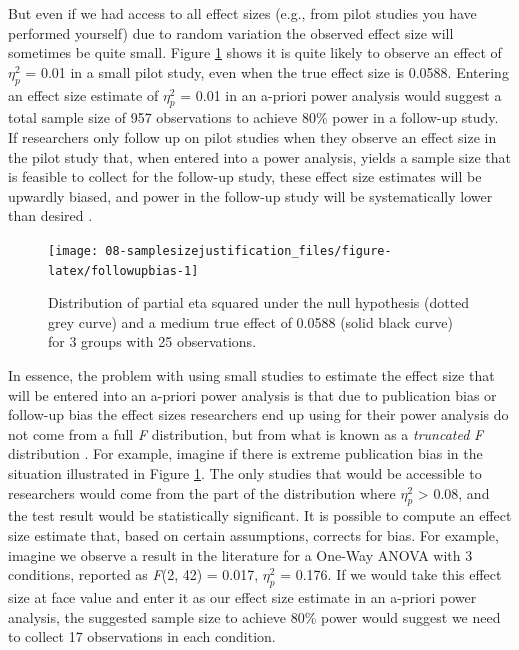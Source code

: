 \documentclass[
  oneside]{krantz}
\begin{document}
But even if we had access to all effect sizes (e.g., from pilot studies you have performed yourself) due to random variation the observed effect size will sometimes be quite small. Figure \ref{fig:followupbias} shows it is quite likely to observe an effect of \(\eta_p^2\) = 0.01 in a small pilot study, even when the true effect size is 0.0588. Entering an effect size estimate of \(\eta_p^2\) = 0.01 in an a-priori power analysis would suggest a total sample size of 957 observations to achieve 80\% power in a follow-up study. If researchers only follow up on pilot studies when they observe an effect size in the pilot study that, when entered into a power analysis, yields a sample size that is feasible to collect for the follow-up study, these effect size estimates will be upwardly biased, and power in the follow-up study will be systematically lower than desired \citep{albers_when_2018}.



\begin{figure}

{\centering \texttt{[image: 08-samplesizejustification\_files/figure-latex/followupbias-1]} 

}

\caption{Distribution of partial eta squared under the null hypothesis (dotted grey curve) and a medium true effect of 0.0588 (solid black curve) for 3 groups with 25 observations.}\label{fig:followupbias}
\end{figure}

In essence, the problem with using small studies to estimate the effect size that will be entered into an a-priori power analysis is that due to publication bias or follow-up bias the effect sizes researchers end up using for their power analysis do not come from a full \emph{F} distribution, but from what is known as a \emph{truncated} \emph{F} distribution \citep{taylor_bias_1996}. For example, imagine if there is extreme publication bias in the situation illustrated in Figure \ref{fig:followupbias}. The only studies that would be accessible to researchers would come from the part of the distribution where \(\eta_p^2\) \textgreater{} 0.08, and the test result would be statistically significant. It is possible to compute an effect size estimate that, based on certain assumptions, corrects for bias. For example, imagine we observe a result in the literature for a One-Way ANOVA with 3 conditions, reported as \emph{F}(2, 42) = 0.017, \(\eta_p^2\) = 0.176. If we would take this effect size at face value and enter it as our effect size estimate in an a-priori power analysis, the suggested sample size to achieve 80\% power would suggest we need to collect 17 observations in each condition.
\end{document}
